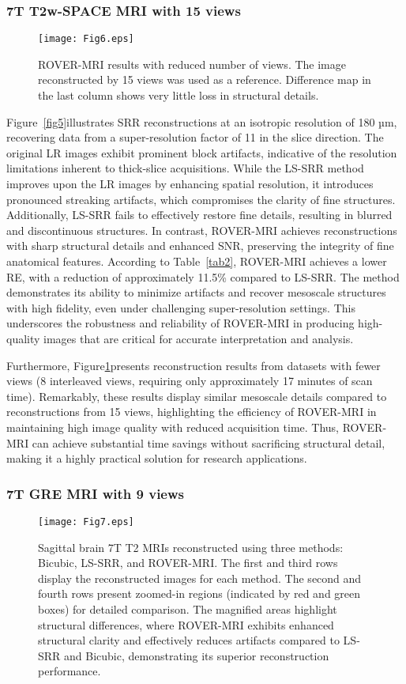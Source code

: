 \documentclass[AMA,STIX2COL]{MRM}
\begin{document}
\subsubsection{7T T2w-SPACE MRI with 15 views}
%
\begin{figure}[t]
\centerline{\texttt{[image: Fig6.eps]}}
\caption{ROVER-MRI results with reduced number of views. The image reconstructed by 15 views was used as a reference. Difference map in the last column shows very little loss in structural details.}\label{fig6}
\end{figure}
%
Figure~\ref{fig5}illustrates SRR reconstructions at an isotropic resolution of 180 µm, recovering data from a super-resolution factor of 11 in the slice direction. The original LR images exhibit prominent block artifacts, indicative of the resolution limitations inherent to thick-slice acquisitions. While the LS-SRR method improves upon the LR images by enhancing spatial resolution, it introduces pronounced streaking artifacts, which compromises the clarity of fine structures. Additionally, LS-SRR fails to effectively restore fine details, resulting in blurred and discontinuous structures. 
%
In contrast, ROVER-MRI achieves reconstructions with sharp structural details and enhanced SNR, preserving the integrity of fine anatomical features. According to Table~\ref{tab2}, ROVER-MRI achieves a lower RE, with a reduction of approximately 11.5\% compared to LS-SRR. The method demonstrates its ability to minimize artifacts and recover mesoscale structures with high fidelity, even under challenging super-resolution settings. This underscores the robustness and reliability of ROVER-MRI in producing high-quality images that are critical for accurate interpretation and analysis.

Furthermore, Figure\ref{fig6}presents reconstruction results from datasets with fewer views (8 interleaved views, requiring only approximately 17 minutes of scan time). Remarkably, these results display similar mesoscale details compared to reconstructions from 15 views, highlighting the efficiency of ROVER-MRI in maintaining high image quality with reduced acquisition time. Thus, ROVER-MRI can achieve substantial time savings without sacrificing structural detail, making it a highly practical solution for research applications.

\subsubsection{7T GRE MRI with 9 views}
\begin{figure}[t]
\centerline{\texttt{[image: Fig7.eps]}}
\caption{Sagittal brain 7T T2 MRIs reconstructed using three methods: Bicubic, LS-SRR, and ROVER-MRI. The first and third rows display the reconstructed images for each method.
The second and fourth rows present zoomed-in regions (indicated by red and green boxes) for detailed comparison. The magnified areas highlight structural differences, where ROVER-MRI exhibits enhanced structural clarity and effectively reduces artifacts compared to LS-SRR and Bicubic, demonstrating its superior reconstruction performance.}\label{fig7}
\end{figure}
\end{document}
